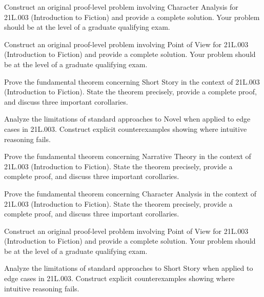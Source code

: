 \documentclass[12pt,a4paper]{exam}
\begin{document}
\begin{questions}
\vspace{0.3cm}

\question[3]
Construct an original proof-level problem involving Character Analysis for 21L.003 (Introduction to Fiction) and provide a complete solution. Your problem should be at the level of a graduate qualifying exam.

\vspace{0.3cm}

\question[2]
Construct an original proof-level problem involving Point of View for 21L.003 (Introduction to Fiction) and provide a complete solution. Your problem should be at the level of a graduate qualifying exam.

\vspace{0.3cm}

\question[3]
Prove the fundamental theorem concerning Short Story in the context of 21L.003 (Introduction to Fiction). State the theorem precisely, provide a complete proof, and discuss three important corollaries.

\vspace{0.3cm}

\question[5]
Analyze the limitations of standard approaches to Novel when applied to edge cases in 21L.003. Construct explicit counterexamples showing where intuitive reasoning fails.

\vspace{0.3cm}

\question[3]
Prove the fundamental theorem concerning Narrative Theory in the context of 21L.003 (Introduction to Fiction). State the theorem precisely, provide a complete proof, and discuss three important corollaries.

\vspace{0.3cm}

\question[5]
Prove the fundamental theorem concerning Character Analysis in the context of 21L.003 (Introduction to Fiction). State the theorem precisely, provide a complete proof, and discuss three important corollaries.

\vspace{0.3cm}

\question[6]
Construct an original proof-level problem involving Point of View for 21L.003 (Introduction to Fiction) and provide a complete solution. Your problem should be at the level of a graduate qualifying exam.

\vspace{0.3cm}

\question[3]
Analyze the limitations of standard approaches to Short Story when applied to edge cases in 21L.003. Construct explicit counterexamples showing where intuitive reasoning fails.


\end{questions}
\end{document}
